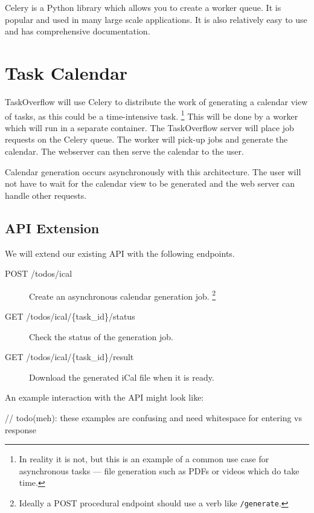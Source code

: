 \documentclass{csse4400}
\begin{document}
Celery is a Python library which allows you to create a worker queue.
It is popular and used in many large scale applications.
It is also relatively easy to use and has comprehensive documentation.


\section{Task Calendar}

TaskOverflow will use Celery to distribute the work of generating a calendar view of tasks,
as this could be a time-intensive task.%
\footnote{In reality it is not, but this is an example of a common use case for asynchronous tasks
          --- file generation such as PDFs or videos which do take time.}
This will be done by a worker which will run in a separate container.
The TaskOverflow server will place job requests on the Celery queue.
The worker will pick-up jobs and generate the calendar.
The webserver can then serve the calendar to the user.

Calendar generation occurs asynchronously with this architecture.
The user will not have to wait for the calendar view to be generated and the web server can handle other requests.

\subsection{API Extension}
\label{sect:apiext}

We will extend our existing API with the following endpoints.

\begin{description}
    \item[POST /todos/ical] Create an asynchronous calendar generation job.%
         \footnote{Ideally a POST procedural endpoint should use a verb like \texttt{/generate}.}
    \item[GET /todos/ical/\{task\_id\}/status] Check the status of the generation job.
    \item[GET /todos/ical/\{task\_id\}/result] Download the generated iCal file when it is ready.
\end{description}

\noindent
An example interaction with the API might look like:

// todo(meh): these examples are confusing and need whitespace for entering vs response
\end{document}
